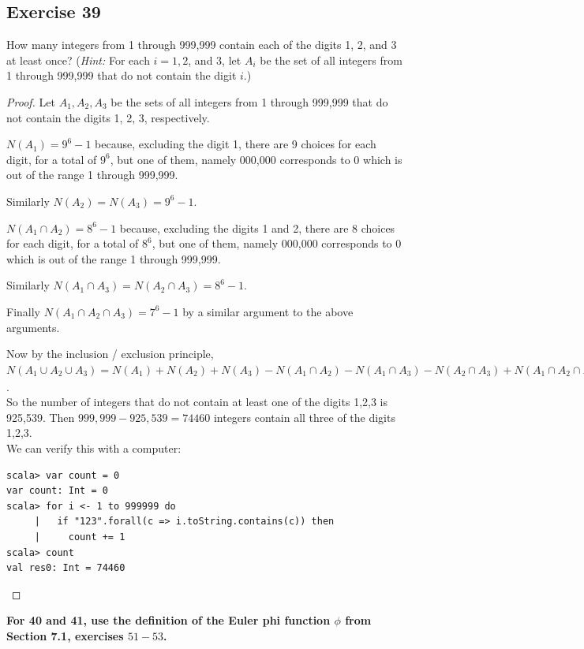 \documentclass[14pt]{extarticle}
\newcommand{\cy}{\color{cyan}}
\begin{document}
\subsection{Exercise 39}
How many integers from 1 through 999,999 contain each of the digits 1, 2, and 3 at least once? ({\it Hint:} For each
\(i = 1, 2\), and 3, let \(A_i\) be the set of all integers from 1 through 999,999 that do not contain the digit $i$.)

\begin{proof}
     Let \(A_1, A_2, A_3\) be the sets of all integers from 1 through 999,999 that do not contain the digits 1, 2, 3,
     respectively.

     \(N(A_1) = 9^6 - 1\) because, excluding the digit 1, there are 9 choices for each digit, for a total of \(9^6\), but
     one of them, namely 000,000 corresponds to 0 which is out of the range 1 through 999,999.

     Similarly \(N(A_2) = N(A_3) = 9^6-1\).

     \(N(A_1 \cap A_2) = 8^6 - 1\) because, excluding the digits 1 and 2, there are 8 choices for each digit, for a total of
     \(8^6\), but one of them, namely 000,000 corresponds to 0 which is out of the range 1 through 999,999.

     Similarly \(N(A_1 \cap A_3) = N(A_2 \cap A_3) = 8^6 - 1\).

     Finally \(N(A_1 \cap A_2 \cap A_3) = 7^6-1\) by a similar argument to the above arguments.

     Now by the inclusion / exclusion principle, \(N(A_1 \cup A_2 \cup A_3) = N(A_1) + N(A_2) + N(A_3) - N(A_1 \cap A_2)
     - N(A_1 \cap A_3) - N(A_2 \cap A_3) + N(A_1 \cap A_2 \cap A_3) = 3(9^6-1) - 3(8^6-1) + 7^6-1 = 925,539\). \\
     So the number of integers that do not contain at least one of the digits 1,2,3 is 925,539. Then \(999,999 - 925,539 =
     74460\) integers contain all three of the digits 1,2,3. \\
     We can verify this with a computer:
     \begin{verbatim}
scala> var count = 0
var count: Int = 0
scala> for i <- 1 to 999999 do
     |   if "123".forall(c => i.toString.contains(c)) then
     |     count += 1
scala> count
val res0: Int = 74460
\end{verbatim}
\end{proof}

{\bf \cy For 40 and 41, use the definition of the Euler phi function \(\phi\) from Section 7.1, exercises $51-53$.}
\end{document}
